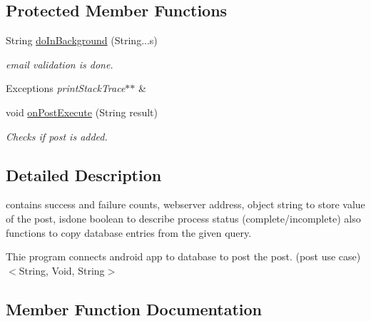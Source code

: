\subsection*{Protected Member Functions}
\begin{DoxyCompactItemize}
\item 
String \hyperlink{classcom_1_1example_1_1sel_1_1lostfound_1_1ScriptRunner_aa1de0b3a2b48a27781b7d05b4aef1fb8}{do\+In\+Background} (String...\+s)
\begin{DoxyCompactList}\small\item\em email validation is done. 
\begin{DoxyExceptions}{Exceptions}
{\em print\+Stack\+Trace$\ast$$\ast$} & \\
\hline
\end{DoxyExceptions}
\end{DoxyCompactList}\item 
void \hyperlink{classcom_1_1example_1_1sel_1_1lostfound_1_1ScriptRunner_a37f7dff1d92f0ca4b3b819e2f2f30742}{on\+Post\+Execute} (String result)
\begin{DoxyCompactList}\small\item\em Checks if post is added. \end{DoxyCompactList}\end{DoxyCompactItemize}


\subsection{Detailed Description}
contains success and failure counts, webserver address, object string to store value of the post, isdone boolean to describe process status (complete/incomplete) also functions to copy database entries from the given query. 

Thie program connects android app to database to post the post. (post use case) $<$String, Void, String$>$ 

\subsection{Member Function Documentation}
